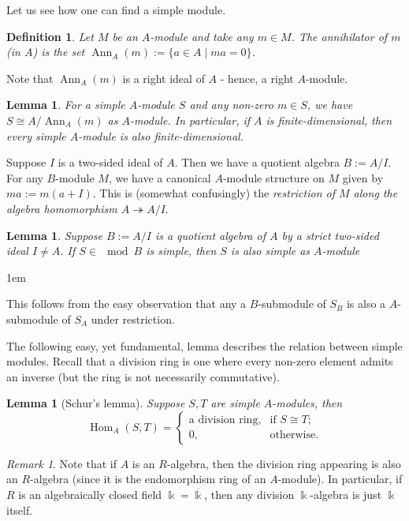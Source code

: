 \documentclass[11pt,a4paper]{article}
\makeatletter
\numberwithin{equation}{section}
\renewenvironment{proof}[1][\proofname]{\par
    \pushQED{\qed}%
    \normalfont \topsep0\p@\@plus6\p@ \labelsep1em\relax
    \trivlist
    \item[\hskip\labelsep\indent
        \bfseries #1]\ignorespaces
    \mbox{}
}{
    \popQED\endtrivlist\@endpefalse
}
\theoremstyle{all}
\newtheorem{lemma}[theorem]{Lemma}
\newtheorem{definition}[theorem]{Definition}
\theoremstyle{remark}
\newtheorem{remark}[theorem]{Remark}
\newcommand{\Hom}{\operatorname{Hom}\nolimits}
\newcommand{\Ker}{\operatorname{Ker}\nolimits}
\newcommand{\Ann}{\operatorname{Ann}\nolimits}
\newcommand{\defn}[1]{\textsl{\color{darkblue} #1}}
\makeatother
\begin{document}
Let us see how one can find a simple module.

\begin{definition}
Let $M$ be an $A$-module and take any $m\in M$.
The \defn{annihilator} of $m$ (in $A$) is the set $\Ann_A(m):=\{a\in A\mid ma=0\}$.
\end{definition}

Note that $\Ann_A(m)$ is a right ideal of $A$ - hence, a right $A$-module.

\begin{lemma}\label{lem:simple as A/Ann}
For a simple $A$-module $S$ and any non-zero $m\in S$, we have $S\cong A/\Ann_A(m)$ as $A$-module.  In particular, if $A$ is finite-dimensional, then every simple $A$-module is also finite-dimensional.
\end{lemma}

Suppose $I$ is a two-sided ideal of $A$.
Then we have a quotient algebra $B:=A/I$.
For any $B$-module $M$, we have a canonical $A$-module structure on $M$ given by $ma:= m(a+I)$.
This is (somewhat confusingly) the \defn{restriction of $M$ along the algebra homomorphism $A\twoheadrightarrow A/I$}.

\begin{lemma}
Suppose $B:=A/I$ is a quotient algebra of $A$ by a strict two-sided ideal $I\neq A$.
If $S\in \mod B$ is simple, then $S$ is also simple as $A$-module
\end{lemma}
\begin{proof}
This follows from the easy observation that any a $B$-submodule of $S_B$ is also a $A$-submodule of $S_A$ under restriction.
\end{proof}

The following easy, yet fundamental, lemma describes the relation between simple modules.
Recall that a division ring is one where every non-zero element admits an inverse (but the ring is not necessarily commutative).

\begin{lemma}[Schur's lemma]\label{lem:Schur}
Suppose $S,T$ are simple $A$-modules, then
\[
\Hom_A(S,T) = \begin{cases}\text{a division ring},& \text{if }S\cong T;\\
0, & \text{otherwise.}
\end{cases}
\]
\end{lemma}
\begin{remark}
Note that if $A$ is an $R$-algebra, then the division ring appearing is also an $R$-algebra (since it is the endomorphism ring of an $A$-module).
In particular, if $R$ is an algebraically closed field $\Bbbk=\overline{\Bbbk}$, then any division $\Bbbk$-algebra is just $\Bbbk$ itself.
\end{remark}
\end{document}

